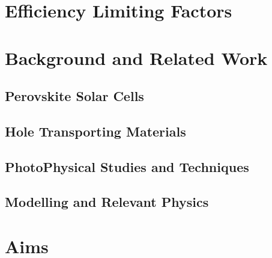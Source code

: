 \section{Efficiency Limiting Factors}


\section{Background and Related Work}\label{sec:background}

	\subsection{Perovskite Solar Cells}

	\subsection{Hole Transporting Materials}

	\subsection{PhotoPhysical Studies and Techniques}

	\subsection{Modelling and Relevant Physics}


\section{Aims}